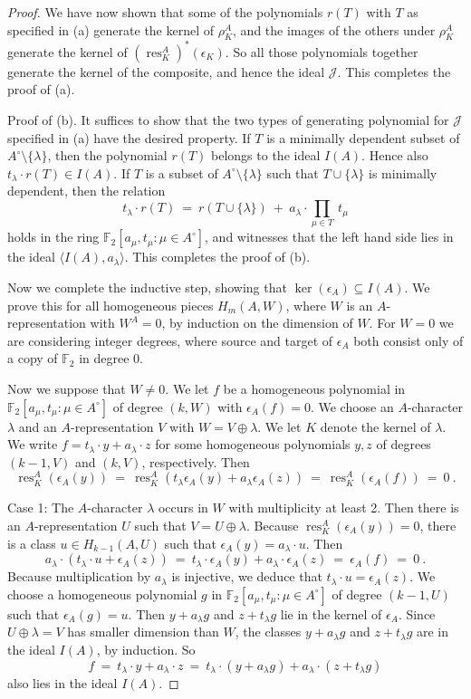\documentclass{amsart}[12pt]
\DeclareMathOperator{\res}{res}
\newcommand{\mF}{{\mathbb F}}
\newcommand{\Jc}{{\mathcal J}}
\newcommand{\td}[1]{\langle #1\rangle}
\numberwithin{equation}{section}
\theoremstyle{definition}
\begin{document}
\begin{proof}
  We have now shown that some of the polynomials $r(T)$ with $T$ as specified in (a)
  generate the kernel of $\rho^A_K$, and the images of the others under $\rho^A_K$
  generate the kernel of $(\res^A_K)^*(\epsilon_K)$. So all those polynomials
  together generate the kernel of the composite, and hence the ideal $\Jc$.
  This completes the proof of (a).\medskip

 
    Proof of (b). It suffices to show that the two types of generating polynomial for
  $\Jc$ specified in (a) have the desired property.
  If $T$ is a minimally dependent subset of $A^\circ\setminus\{\lambda\}$,
  then the polynomial $r(T)$ belongs to the ideal $I(A)$.
  Hence also  $t_\lambda\cdot r(T)\in I(A)$.
  If $T$ is a subset of $A^\circ\setminus\{\lambda\}$ such that
  $T\cup\{\lambda\}$ is minimally dependent, then the relation
  \[  t_\lambda \cdot r(T)\
    = \   r(T\cup\{\lambda\}) \ + \ a_\lambda \cdot {\prod}_{\mu\in T}\ t_\mu  \]
  holds in the ring $\mF_2[a_\mu,t_\mu\colon \mu\in A^\circ]$,
  and witnesses that the left hand side lies in the ideal $\td{I(A),a_\lambda}$.
  This completes the proof of (b).\medskip
  
  Now we complete the inductive step, showing that $\ker(\epsilon_A)\subseteq I(A)$.
  We prove this for all homogeneous pieces $H_m(A,W)$,
  where $W$ is an $A$-representation with $W^A=0$,
  by induction on the dimension of $W$.
  For $W=0$ we are considering integer degrees,
  where source and target of $\epsilon_A$ both
  consist only of a copy of $\mF_2$ in degree 0.
  
  Now we suppose that $W\ne 0$. 
  We let $f$ be a homogeneous polynomial in $\mF_2[a_\mu,t_\mu\colon  \mu\in A^\circ]$
  of degree $(k,W)$ with $\epsilon_A(f)=0$.
  We choose an $A$-character $\lambda$ and
  an $A$-representation $V$ with $W=V\oplus\lambda$.
  We let $K$ denote the kernel of $\lambda$.
  We write $f=t_\lambda\cdot y+a_\lambda\cdot z$ for some homogeneous polynomials $y,z$
  of degrees $(k-1,V)$ and $(k,V)$, respectively. Then
  \[
    \res^A_K(\epsilon_A(y))\ = \
    \res^A_K( t_\lambda\epsilon_A(y) + a_\lambda \epsilon_A(z))
    \ = \     \res^A_K( \epsilon_A(f))    \ = \ 0 \ . \]
  
  Case 1: The $A$-character $\lambda$ occurs in $W$ with multiplicity at least 2.
  Then there is an $A$-representation $U$ such that $V=U\oplus \lambda$.
  Because $\res^A_K(\epsilon_A(y))=0$, there is a class $u\in H_{k-1}(A,U)$
  such that $\epsilon_A(y)=a_\lambda\cdot u$.
  Then 
  \[ a_\lambda\cdot (t_\lambda\cdot u+\epsilon_A(z))\ =\
    t_\lambda\cdot\epsilon_A(y)+a_\lambda\cdot\epsilon_A(z)\ = \ \epsilon_A(f)\ =\ 0\ . \]
  Because multiplication by $a_\lambda$ is injective,
  we deduce that $t_\lambda\cdot u=\epsilon_A(z)$.
  We choose a homogeneous polynomial $g$ in $\mF_2[a_\mu,t_\mu\colon\mu\in A^\circ]$
  of degree $(k-1,U)$ such that $\epsilon_A(g)=u$.
  Then $y+a_\lambda g$ and $z+t_\lambda g$ lie in the kernel of $\epsilon_A$.
  Since $U\oplus\lambda=V$ has smaller dimension than $W$,
  the classes $y+a_\lambda g$ and $z+t_\lambda g$
  are in the ideal $I(A)$, by induction. So
  \[  f\ =\ t_\lambda\cdot y+a_\lambda\cdot z\ = \
    t_\lambda\cdot(y+a_\lambda g) +a_\lambda\cdot(z+t_\lambda g)  \]
  also lies in the ideal $I(A)$.\smallskip


\end{proof}
\end{document}
